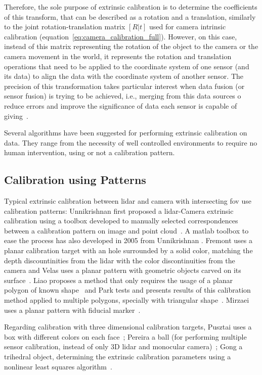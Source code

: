 Therefore, the sole purpose of extrinsic calibration is to determine the coefficients of this transform, that can be described as a rotation and a translation, similarly to the joint rotation-translation matrix $[R|t]$ used for camera intrinsic calibration (equation~\ref{eq:camera_calibration_full}). However, on this case, instead of this matrix representing the rotation of the object to the camera or the camera movement in the world, it represents the rotation and translation operations that need to be applied to the coordinate system of one sensor (and its data) to align the data with the coordinate system of another sensor. The precision of this transformation takes particular interest when data fusion (or sensor fusion) is trying to be achieved, i.e., merging from this data sources o reduce errors and improve the significance of data each sensor is capable of giving~\citeneeded. 

Several algorithms have been suggested for performing extrinsic calibration on data. They range from the necessity of well controlled environments to require no human intervention, using or not a calibration pattern. 


\subsection{Calibration using Patterns}
Typical extrinsic calibration between \ac{lidar} and camera with intersecting \ac{fov} use calibration patterns: Unnikrishnan first proposed a \ac{lidar}-Camera extrinsic calibration using a toolbox developed to manually selected correspondences between a calibration pattern on image and point cloud~\cite{Unnikrishnan2005}. A \ac{matlab} toolbox to ease the process has also developed in 2005 from Unnikrishnan \etal. Fremont \etal uses a planar calibration target with an hole surrounded by a solid color, matching the depth discountinities from the \ac{lidar} with the color discontinuities from the camera \cite{Fremont2013} and Velas uses a planar pattern with geometric objects carved on its surface~\cite{MartinVelas2013}. Liao \etal proposes a method that only requires the usage of a planar polygon of known shape~\cite{Liao2019} and Park \etal tests and presents results of this calibration method applied to multiple polygons, specially with triangular shape~\cite{Park2014}. Mirzaei \etal uses a planar pattern with fiducial marker~\cite{Mirzaei2012}. 

Regarding calibration with three dimensional calibration targets, Pusztai uses a box with different colors on each face~\cite{Pusztai2018}; Pereira a ball (for performing multiple sensor calibration, instead of only 3D \ac{lidar} and monocular camera)~\cite{Pereira}; Gong a trihedral object, determining the extrinsic calibration parameters using a nonlinear least squares algorithm~\cite{Gong2013}.

